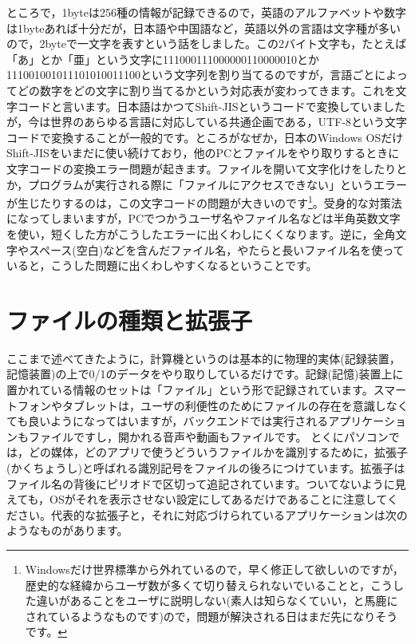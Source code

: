 \documentclass{ltjsbook}
\begin{document}
ところで，1byteは256種の情報が記録できるので，英語のアルファベットや数字は1byteあれば十分だが，日本語や中国語など，英語以外の言語は文字種が多いので，2byteで一文字を表すという話をしました。この2バイト文字も，たとえば「あ」とか「亜」という文字に111000111000000110000010とか111001001011101010011100という文字列を割り当てるのですが，言語ごとによってどの数字をどの文字に割り当てるかという対応表が変わってきます。これを文字コードと言います。日本語はかつてShift-JISというコードで変換していましたが，今は世界のあらゆる言語に対応している共通企画である，UTF-8という文字コードで変換することが一般的です。ところがなぜか，日本のWindows OSだけShift-JISをいまだに使い続けており，他のPCとファイルをやり取りするときに文字コードの変換エラー問題が起きます。ファイルを開いて文字化けをしたりとか，プログラムが実行される際に「ファイルにアクセスできない」というエラーが生じたりするのは，この文字コードの問題が大きいのです\footnote{Windowsだけ世界標準から外れているので，早く修正して欲しいのですが，歴史的な経緯からユーザ数が多くて切り替えられないでいることと，こうした違いがあることをユーザに説明しない(素人は知らなくていい，と馬鹿にされているようなものです)ので，問題が解決される日はまだ先になりそうです。}。受身的な対策法になってしまいますが，PCでつかうユーザ名やファイル名などは半角英数文字を使い，短くした方がこうしたエラーに出くわしにくくなります。逆に，全角文字やスペース(空白)などを含んだファイル名，やたらと長いファイル名を使っていると，こうした問題に出くわしやすくなるということです。


\section{ファイルの種類と拡張子}
\label{suffix}
ここまで述べてきたように，計算機というのは基本的に物理的実体(記録装置，記憶装置)の上で0/1のデータをやり取りしているだけです。記録(記憶)装置上に置かれている情報のセットは「ファイル」という形で記録されています。スマートフォンやタブレットは，ユーザの利便性のためにファイルの存在を意識しなくても良いようになってはいますが，バックエンドでは実行されるアプリケーションもファイルですし，開かれる音声や動画もファイルです。
とくにパソコンでは，どの媒体，どのアプリで使うどういうファイルかを識別するために，拡張子(かくちょうし)と呼ばれる識別記号をファイルの後ろにつけています。拡張子はファイル名の背後にピリオドで区切って追記されています。ついてないように見えても，OSがそれを表示させない設定にしてあるだけであることに注意してください。代表的な拡張子と，それに対応づけられているアプリケーションは次のようなものがあります。
\end{document}

